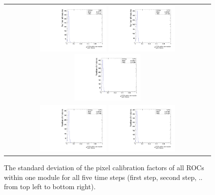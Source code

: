 \begin{figure}[!b]
  \centering 
  \begin{tabular}{c}
    \includegraphics[width=0.33\textwidth]{figures/analysis_2/PixelCalibration/rmsOfROCs_N_0_AB_CL0} 
    \includegraphics[width=0.33\textwidth]{figures/analysis_2/PixelCalibration/rmsOfROCs_N_0_C1_CL0} 
    \includegraphics[width=0.33\textwidth]{figures/analysis_2/PixelCalibration/rmsOfROCs_N_0_C2_CL0} \\
    \includegraphics[width=0.33\textwidth]{figures/analysis_2/PixelCalibration/rmsOfROCs_N_0_D1_CL0} 
    \includegraphics[width=0.33\textwidth]{figures/analysis_2/PixelCalibration/rmsOfROCs_N_0_D2_CL0} 
  \end{tabular}
  \caption{The standard deviation of the pixel calibration factors of all ROCs within one module for all five time steps (first step, second step, .. from top left to bottom right).}
  \label{fig:SigmaPixelCalibrationROCs}
\end{figure} 
